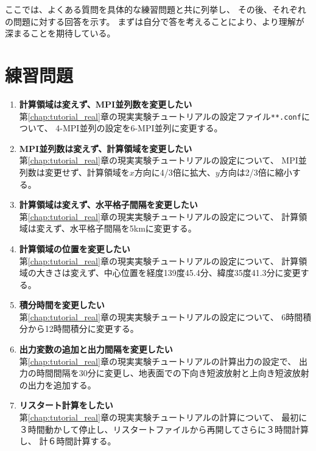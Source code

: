 ここでは、よくある質問を具体的な練習問題と共に列挙し、
その後、それぞれの問題に対する回答を示す。
まずは自分で答を考えることにより、より理解が深まることを期待している。


\section*{練習問題}

\begin{enumerate}
\item {\bf 計算領域は変えず、MPI並列数を変更したい}\\
第\ref{chap:tutorial_real}章の現実実験チュートリアルの設定ファイル\verb|**.conf|について、
4-MPI並列の設定を6-MPI並列に変更する。

\item {\bf MPI並列数は変えず、計算領域を変更したい}\\
第\ref{chap:tutorial_real}章の現実実験チュートリアルの設定について、
MPI並列数は変更せず、計算領域を$x$方向に4/3倍に拡大、$y$方向は2/3倍に縮小する。

\item {\bf 計算領域は変えず、水平格子間隔を変更したい}\\
第\ref{chap:tutorial_real}章の現実実験チュートリアルの設定について、
計算領域は変えず、水平格子間隔を5kmに変更する。

\item {\bf 計算領域の位置を変更したい}\\
第\ref{chap:tutorial_real}章の現実実験チュートリアルの設定について、
計算領域の大きさは変えず、中心位置を経度139度45.4分、緯度35度41.3分に変更する。

\item {\bf 積分時間を変更したい}\\
第\ref{chap:tutorial_real}章の現実実験チュートリアルの設定について、
6時間積分から12時間積分に変更する。

\item {\bf 出力変数の追加と出力間隔を変更したい}\\
第\ref{chap:tutorial_real}章の現実実験チュートリアルの計算出力の設定で、
出力の時間間隔を30分に変更し、地表面での下向き短波放射と上向き短波放射の出力を追加する。

\item {\bf リスタート計算をしたい}\\
第\ref{chap:tutorial_real}章の現実実験チュートリアルの計算について、
最初に３時間動かして停止し、リスタートファイルから再開してさらに３時間計算し、
計６時間計算する。


\end{enumerate}

